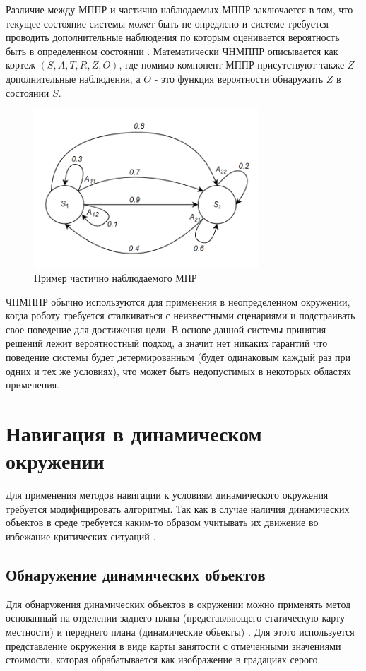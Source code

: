 Различие между МППР и частично наблюдаемых МППР заключается в том, что текущее состояние системы может быть не опредлено и системе требуется проводить дополнительные наблюдения по которым оценивается вероятность быть в определенном состоянии \cite{krishnamurthy2016partially}. Математически ЧНМППР описывается как кортеж $(S, A, T, R, Z, O)$, где помимо компонент МППР присутствуют также $Z$ - дополнительные наблюдения, а $O$ - это функция вероятности обнаружить $Z$ в состоянии $S$.

\begin{figure}[h]
    \centering
    \includegraphics[width=0.75\textwidth]{images/chap_1/pomdp.png}
    \caption{Пример частично наблюдаемого МПР}
    \label{fig:podmp}
\end{figure}

ЧНМППР обычно используются для применения в неопределенном окружении, когда роботу требуется сталкиваться с неизвестными сценариями и подстраивать свое поведение для достижения цели. В основе данной системы принятия решений лежит вероятностный подход, а значит нет никаких гарантий что поведение системы будет детермированным (будет одинаковым каждый раз при одних и тех же условиях), что может быть недопустимых в некоторых областях применения.

\section{Навигация в динамическом окружении}
Для применения методов навигации к условиям динамического окружения требуется модифицировать алгоритмы. Так как в случае наличия динамических объектов в среде требуется каким-то образом учитывать их движение во избежание критических ситуаций \cite{laugier2007autonomous}.

\subsection{Обнаружение динамических объектов}
Для обнаружения динамических объектов в окружении можно применять метод основанный на отделении заднего плана (представляющего статическую карту местности) и переднего плана (динамические объекты) \cite{albers2019online}. Для этого используется представление окружения в виде карты занятости с отмеченными значениями стоимости, которая обрабатывается как изображение в градациях серого. 

